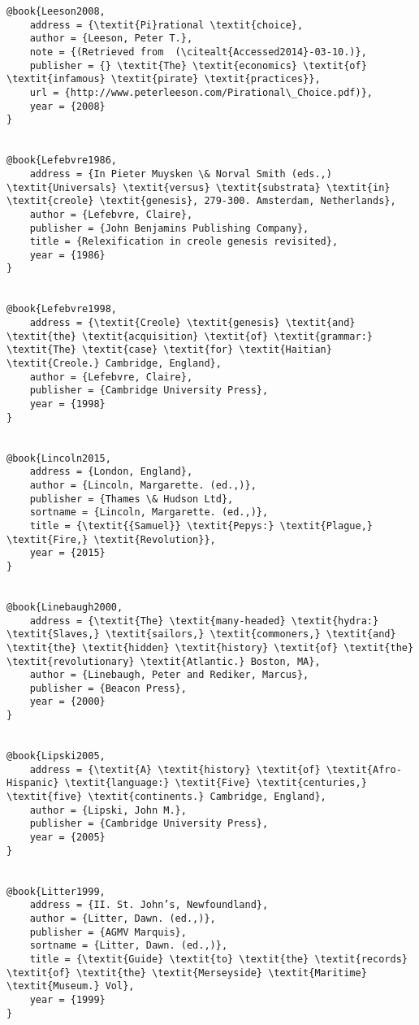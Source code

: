 \begin{verbatim}
@book{Leeson2008,
	address = {\textit{Pi}rational \textit{choice},
	author = {Leeson, Peter T.},
	note = {(Retrieved from  (\citealt{Accessed2014}-03-10.)},
	publisher = {} \textit{The} \textit{economics} \textit{of} \textit{infamous} \textit{pirate} \textit{practices}},
	url = {http://www.peterleeson.com/Pirational\_Choice.pdf)},
	year = {2008}
}


@book{Lefebvre1986,
	address = {In Pieter Muysken \& Norval Smith (eds.,) \textit{Universals} \textit{versus} \textit{substrata} \textit{in} \textit{creole} \textit{genesis}, 279-300. Amsterdam, Netherlands},
	author = {Lefebvre, Claire},
	publisher = {John Benjamins Publishing Company},
	title = {Relexification in creole genesis revisited},
	year = {1986}
}


@book{Lefebvre1998,
	address = {\textit{Creole} \textit{genesis} \textit{and} \textit{the} \textit{acquisition} \textit{of} \textit{grammar:} \textit{The} \textit{case} \textit{for} \textit{Haitian} \textit{Creole.} Cambridge, England},
	author = {Lefebvre, Claire},
	publisher = {Cambridge University Press},
	year = {1998}
}


@book{Lincoln2015,
	address = {London, England},
	author = {Lincoln, Margarette. (ed.,)},
	publisher = {Thames \& Hudson Ltd},
	sortname = {Lincoln, Margarette. (ed.,)},
	title = {\textit{{Samuel}} \textit{Pepys:} \textit{Plague,} \textit{Fire,} \textit{Revolution}},
	year = {2015}
}


@book{Linebaugh2000,
	address = {\textit{The} \textit{many-headed} \textit{hydra:} \textit{Slaves,} \textit{sailors,} \textit{commoners,} \textit{and} \textit{the} \textit{hidden} \textit{history} \textit{of} \textit{the} \textit{revolutionary} \textit{Atlantic.} Boston, MA},
	author = {Linebaugh, Peter and Rediker, Marcus},
	publisher = {Beacon Press},
	year = {2000}
}


@book{Lipski2005,
	address = {\textit{A} \textit{history} \textit{of} \textit{Afro-Hispanic} \textit{language:} \textit{Five} \textit{centuries,} \textit{five} \textit{continents.} Cambridge, England},
	author = {Lipski, John M.},
	publisher = {Cambridge University Press},
	year = {2005}
}


@book{Litter1999,
	address = {II. St. John’s, Newfoundland},
	author = {Litter, Dawn. (ed.,)},
	publisher = {AGMV Marquis},
	sortname = {Litter, Dawn. (ed.,)},
	title = {\textit{Guide} \textit{to} \textit{the} \textit{records} \textit{of} \textit{the} \textit{Merseyside} \textit{Maritime} \textit{Museum.} Vol},
	year = {1999}
}



\end{verbatim}
